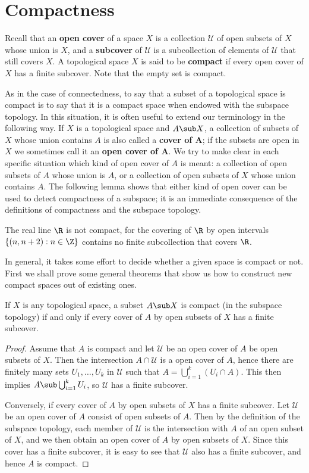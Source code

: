 \section{Compactness}
Recall that an \textbf{open cover} of a space $X$ is a collection $\mathcal{U}$ of open subsets of $X$ whose union is $X$, and a \textbf{subcover} of $\mathcal{U}$ is a subcollection of elements of $\mathcal{U}$ that still covers $X$. A topological space $X$ is said to be \textbf{compact} if every open cover of $X$ has a finite subcover. Note that the empty set is
compact.\par
As in the case of connectedness, to say that a subset of a topological space is compact is to say that it is a compact space when endowed with the subspace topology. In this situation, it is often useful to extend our terminology in the  following way. If $X$ is a topological space and $A\sub X$, a collection of subsets of $X$ whose union contains $A$ is also called a \textbf{cover of $\bm{A}$}; if the subsets are open in $X$ we sometimes call it an \textbf{open cover of $\bm{A}$}. We try to make clear in each specific situation which kind of open cover of $A$ is meant: a collection of open subsets of $A$ whose union is $A$, or a collection of open subsets of $X$ whose union contains $A$. The following lemma shows that either kind of open cover can be used to detect compactness of a subspace; it is an immediate consequence of the definitions of compactness and the subspace topology.
\begin{example}
The real line $\R$ is not compact, for the covering of $\R$ by open intervals $\{(n,n+2):n\in\Z\}$ contains no finite subcollection that covers $\R$.
\end{example}
In general, it takes some effort to decide whether a given space is compact or not. First we shall prove some general theorems that show us how to construct new compact spaces out of existing ones.
\begin{lemma}
If $X$ is any topological space, a subset $A\sub X$ is compact (in the subspace topology) if and only if every cover of $A$ by open subsets of $X$ has a finite subcover.
\end{lemma}
\begin{proof}
Assume that $A$ is compact and let $\mathcal{U}$ be an open cover of $A$ be open subsets of $X$. Then the intersection $A\cap\mathcal{U}$ is a open cover of $A$, hence there are finitely many sets $U_1,\dots,U_k$ in $\mathcal{U}$ such that $A=\bigcup_{i=1}^{k}(U_i\cap A)$. This then implies $A\sub\bigcup_{i=1}^{k}U_i$, so $\mathcal{U}$ has a finite subcover.\par
Conversely, if every cover of $A$ by open subsets of $X$ has a finite subcover. Let $\mathcal{U}$ be an open cover of $A$ consist of open subsets of $A$. Then by the definition of the subspace topology, each member of $\mathcal{U}$ is the intersection with $A$ of an open subset of $X$, and we then obtain an open cover of $A$ by open subsets of $X$. Since this cover has a finite subcover, it is easy to see that $\mathcal{U}$ also has a finite subcover, and hence $A$ is compact. 
\end{proof}

